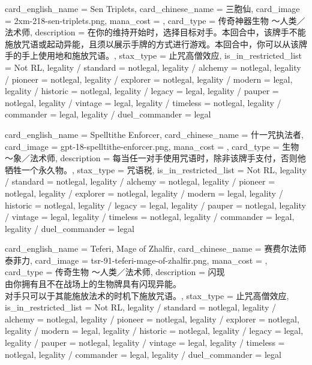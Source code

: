 \documentclass[lang = cn, color = black, 10pt]{AllThatStax}
\begin{document}
\card
{
	card_english_name = {Sen Triplets},
	card_chinese_name = {三胞仙},
	card_image = 2xm-218-sen-triplets.png,
	mana_cost = ,
	card_type = 传奇神器生物 ～人类／法术师,
	description = {在你的维持开始时，选择目标对手。本回合中，该牌手不能施放咒语或起动异能，且须以展示手牌的方式进行游戏。本回合中，你可以从该牌手的手上使用地和施放咒语。},
	stax_type = 止咒高僧效应,
	is_in_restricted_list = Not RL,
	legality / standard = notlegal,
	legality / alchemy = notlegal,
	legality / pioneer = notlegal,
	legality / explorer = notlegal,
	legality / modern = legal,
	legality / historic = notlegal,
	legality / legacy = legal,
	legality / pauper = notlegal,
	legality / vintage = legal,
	legality / timeless = notlegal,
	legality / commander = legal,
	legality / duel_commander = legal
}

\card
{
	card_english_name = {Spelltithe Enforcer},
	card_chinese_name = {什一咒执法者},
	card_image = gpt-18-spelltithe-enforcer.png,
	mana_cost = ,
	card_type = 生物～象／法术师,
	description = {每当任一对手使用咒语时，除非该牌手支付，否则他牺牲一个永久物。},
	stax_type = 咒语税,
	is_in_restricted_list = Not RL,
	legality / standard = notlegal,
	legality / alchemy = notlegal,
	legality / pioneer = notlegal,
	legality / explorer = notlegal,
	legality / modern = legal,
	legality / historic = notlegal,
	legality / legacy = legal,
	legality / pauper = notlegal,
	legality / vintage = legal,
	legality / timeless = notlegal,
	legality / commander = legal,
	legality / duel_commander = legal
}

\card
{
	card_english_name = {Teferi, Mage of Zhalfir},
	card_chinese_name = {赛费尔法师泰菲力},
	card_image = tsr-91-teferi-mage-of-zhalfir.png,
	mana_cost = ,
	card_type = 传奇生物 ～人类／法术师,
	description = {闪现\\
		由你拥有且不在战场上的生物牌具有闪现异能。\\
		对手只可以于其能施放法术的时机下施放咒语。},
	stax_type = 止咒高僧效应,
	is_in_restricted_list = Not RL,
	legality / standard = notlegal,
	legality / alchemy = notlegal,
	legality / pioneer = notlegal,
	legality / explorer = notlegal,
	legality / modern = legal,
	legality / historic = notlegal,
	legality / legacy = legal,
	legality / pauper = notlegal,
	legality / vintage = legal,
	legality / timeless = notlegal,
	legality / commander = legal,
	legality / duel_commander = legal
}
\end{document}
